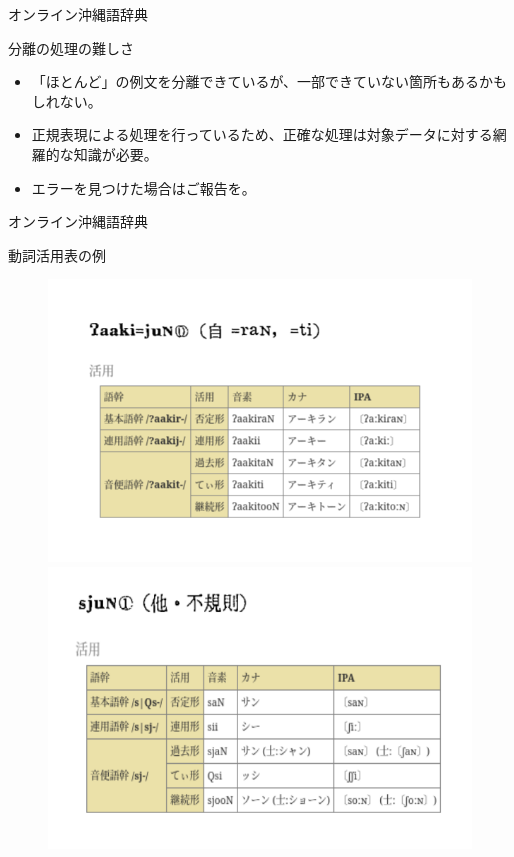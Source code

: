 \documentclass[14pt]{beamer}
\begin{document}
\begin{frame}{オンライン沖縄語辞典}
  \begin{block}{分離の処理の難しさ}
    \begin{itemize}
    \item 「ほとんど」の例文を分離できているが、一部できていない箇所もあるかもしれない。
    \item 正規表現による処理を行っているため、正確な処理は対象データに対する網羅的な知識が必要。
    \item エラーを見つけた場合はご報告を。
    \end{itemize}
  \end{block}
\end{frame}

\begin{frame}{オンライン沖縄語辞典}
  \begin{block}{動詞活用表の例}
    \begin{figure}[ht]
      \centering
      \begin{minipage}{0.4\paperwidth}
        \includegraphics[height=0.36\paperheight]{verb-conugation-comparison.png}
      \end{minipage}%
      \begin{minipage}{0.4\textwidth}
        \includegraphics[height=0.34\paperheight]{verb-conjugation-comparison-2.png}
      \end{minipage}
    \end{figure}
  \end{block}
\end{frame}
\end{document}
